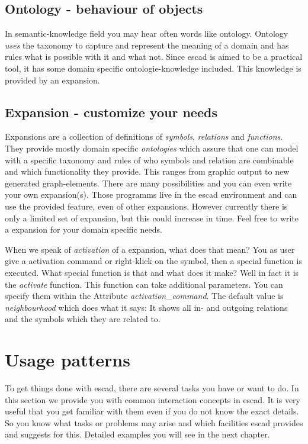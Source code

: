 \documentclass[a4paper, 12pt, openany]{scrbook}
\begin{document}
\subsection{Ontology - behaviour of objects}
In semantic-knowledge field you may hear often words like ontology. Ontology \emph{uses} the taxonomy to capture and represent the meaning of a domain and has rules what is possible with it and what not. Since escad is aimed to be a practical tool, it has some domain specific ontologie-knowledge included. This knowledge is provided by an expansion.
\subsection{Expansion - customize your needs}
Expansions are a collection of definitions of \emph{symbols}, \emph{relations} and \emph{functions}. They provide mostly domain specific \emph{ontologies} which assure that one can model with a specific taxonomy and rules of who symbols and relation are combinable and which functionality they provide. This ranges from graphic output to new generated graph-elements. There are many possibilities and you can even write your own expansion(s). Those programms live in the escad environment and can use the provided feature, even of other expansions. However currently there is only a limited set of expansion, but this could increase in time. Feel free to write a expansion for your domain specific needs.

When we speak of \emph{activation} of a expansion, what does that mean? You as user give a activation command or right-klick on the symbol, then a special function is executed. What special function is that and what does it make? Well in fact it is the \emph{activate} function. This function can take additional parameters. You can specify them within the Attribute \emph{activation\_command}. The default value is \emph{neighbourhood} which does what it says: It shows all in- and outgoing relations and the symbols which they are related to.
\section{Usage patterns}
To get things done with escad, there are several tasks you have or want to do. In this section we provide you with common interaction concepts in escad. It is very useful that you get familiar with them even if you do not know the exact details. So you know what tasks or problems may arise and which facilities escad provides and suggests for this. Detailed examples you will see in the next chapter.
\end{document}
